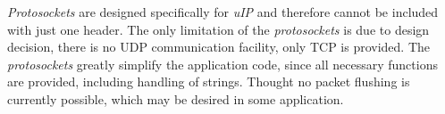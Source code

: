   \emph{Protosockets} are designed specifically for \emph{uIP} and therefore 
 cannot be included with just one header. The only limitation of the
 \emph{protosockets} is due to design decision, there is no UDP communication
 facility, only TCP is provided. The \emph{protosockets} greatly simplify the
 application code, since all necessary functions are provided, including
 handling of strings. Thought no packet flushing is currently possible, which
 may be desired in some application.
 


   
